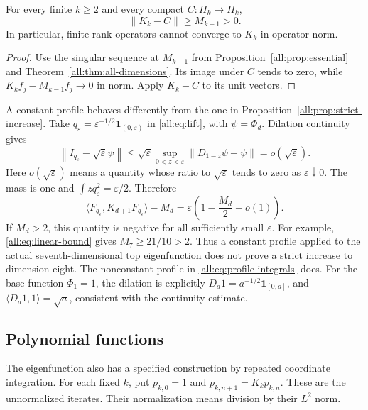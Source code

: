 \documentclass[11pt]{article}
\begin{document}
\begin{corollary}\label{all:cor:compact-distance}
For every finite $k\geq2$ and every compact $C:H_k\to H_k$,
\[
                         \|K_k-C\|\geq M_{k-1}>0.
\]
In particular, finite-rank operators cannot converge to $K_k$ in operator norm.
\end{corollary}

\begin{proof}
Use the singular sequence at $M_{k-1}$ from
Proposition~\ref{all:prop:essential} and Theorem~\ref{all:thm:all-dimensions}.
Its image under $C$ tends to zero, while
$K_kf_j-M_{k-1}f_j\to0$ in norm.  Apply $K_k-C$ to its unit vectors.
\end{proof}

\begin{example}\label{all:ex:flat-profile}
A constant profile behaves differently from the one in
Proposition~\ref{all:prop:strict-increase}.
Take $q_\varepsilon=\varepsilon^{-1/2}\mathbf1_{(0,\varepsilon)}$ in
\eqref{all:eq:lift}, with $\psi=\Phi_d$.
Dilation continuity gives
\[
 \left\|I_{q_\varepsilon}-\sqrt{\varepsilon}\psi\right\|
 \leq\sqrt{\varepsilon}\sup_{0<z<\varepsilon}
                         \|D_{1-z}\psi-\psi\|=o(\sqrt{\varepsilon}).
\]
Here $o(\sqrt{\varepsilon})$ means a quantity whose ratio to
$\sqrt{\varepsilon}$ tends to zero as $\varepsilon\downarrow0$.
The mass is one and $\int zq_\varepsilon^2=\varepsilon/2$.
Therefore
\[
 \langle F_{q_\varepsilon},K_{d+1}F_{q_\varepsilon}\rangle-M_d
       =\varepsilon\left(1-\frac{M_d}{2}+o(1)\right).
\]
If $M_d>2$, this quantity is negative for all sufficiently small
$\varepsilon$.
For example, \eqref{all:eq:linear-bound} gives $M_7\geq21/10>2$.
Thus a constant profile applied to the actual seventh-dimensional top
eigenfunction does not prove a strict increase to dimension eight.
The nonconstant profile in \eqref{all:eq:profile-integrals} does.
For the base function $\Phi_1=1$, the dilation is explicitly
$D_a1=a^{-1/2}\mathbf1_{[0,a]}$, and
$\langle D_a1,1\rangle=\sqrt a$, consistent with the continuity estimate.
\end{example}

\subsection{Polynomial functions}

The eigenfunction also has a specified construction by repeated coordinate
integration.  For each fixed $k$, put
$p_{k,0}=1$ and $p_{k,n+1}=K_kp_{k,n}$.
These are the unnormalized iterates.  Their normalization means division
by their $L^2$ norm.
\end{document}
